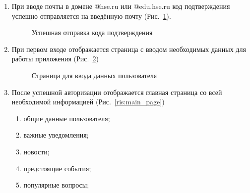 \documentclass{../includes/TechDoc}
\begin{document}
    \begin{enumerate}
        \item При вводе почты в домене @hse.ru или @edu.hse.ru код подтверждения успешно отправляется на введённую почту (Рис.~\ref{fig:login_code_success}).
        \begin{figure}[h]
            \centering
            \caption{Успешная отправка кода подтверждения}
            \label{fig:login_code_success}
        \end{figure}

        \item При первом входе отображается страница с вводом необходимых данных для работы приложения (Рис.~\ref{fig:wait_page})
        \begin{figure}[h]
            \centering
            \caption{Страница для ввода данных пользователя}
            \label{fig:wait_page}
        \end{figure}

        \item После успешной авторизации отображается главная страница со всей необходимой информацией (Рис.~\ref{ris:main_page})
        \begin{enumerate}
            \item общие данные пользователя;
            \item важные уведомления;
            \item новости;
            \item предстоящие события;
            \item популярные вопросы;
        \end{enumerate}


\end{enumerate}
\end{document}
